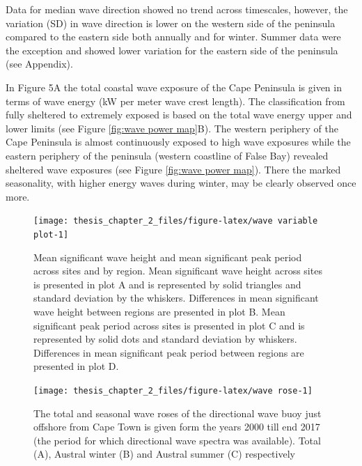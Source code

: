 \documentclass[
  a4paper,
]{article}
\begin{document}
Data for median wave direction showed no trend across timescales,
however, the variation (SD) in wave direction is lower on the western
side of the peninsula compared to the eastern side both annually and for
winter. Summer data were the exception and showed lower variation for
the eastern side of the peninsula (see Appendix).

In Figure 5A the total coastal wave exposure of the Cape Peninsula is
given in terms of wave energy (kW per meter wave crest length). The
classification from fully sheltered to extremely exposed is based on the
total wave energy upper and lower limits (see Figure
\ref{fig:wave power map}B). The western periphery of the Cape Peninsula
is almost continuously exposed to high wave exposures while the eastern
periphery of the peninsula (western coastline of False Bay) revealed
sheltered wave exposures (see Figure \ref{fig:wave power map}). There
the marked seasonality, with higher energy waves during winter, may be
clearly observed once more.

\begin{figure}

{\centering \texttt{[image: thesis\_chapter\_2\_files/figure-latex/wave variable plot-1]} 

}

\caption{\label{fig:wave variable plot}Mean significant wave height and mean significant peak period across sites and by region. Mean significant wave height across sites is presented in plot A and is represented by solid triangles and standard deviation by the whiskers. Differences in mean significant wave height between regions are presented in plot B. Mean significant peak period across sites is presented in plot C and is represented by solid dots and standard deviation by whiskers. Differences in mean significant peak period between regions are presented in plot D.}\label{fig:wave variable plot}
\end{figure}

\begin{figure}

{\centering \texttt{[image: thesis\_chapter\_2\_files/figure-latex/wave rose-1]} 

}

\caption{\label{fig:wave rose}The total and seasonal wave roses of the directional wave buoy just offshore from Cape Town is given form the years 2000 till end 2017 (the period for which directional wave spectra was available). Total (A), Austral winter (B) and Austral summer (C) respectively}\label{fig:wave rose}
\end{figure}
\end{document}
